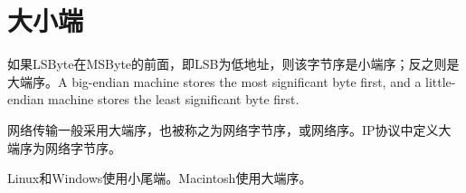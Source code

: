 \section{大小端}

如果LSByte在MSByte的前面，即LSB为低地址，则该字节序是小端序；反之则是大端序。A big-endian machine stores the most significant byte first, and a little-endian machine stores the least significant byte first. 

网络传输一般采用大端序，也被称之为网络字节序，或网络序。IP协议中定义大端序为网络字节序。

Linux和Windows使用小尾端。Macintosh使用大端序。

